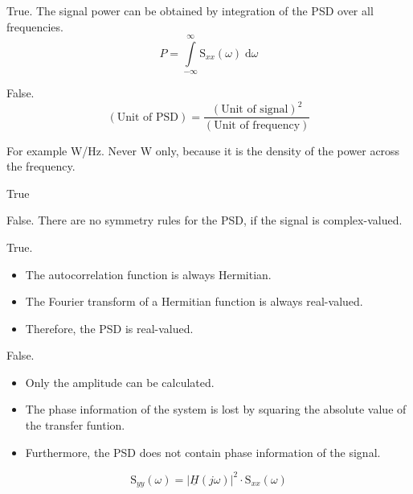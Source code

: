\begin{solution}
	\begin{tasks}
		\task
		True. The signal power can be obtained by integration of the PSD over all frequencies.
		\begin{equation*}
			P = \int\limits_{-\infty}^{\infty} \mathrm{S}_{xx}(\omega) \; \mathrm{d} \omega
		\end{equation*}
		
		\task
		False.
		\begin{equation*}
			\left(\text{Unit of PSD}\right) = \frac{\left(\text{Unit of signal}\right)^2}{\left(\text{Unit of frequency}\right)}
		\end{equation*}
		
		For example \si{W/Hz}. Never \si{W} only, because it is the density of the power across the frequency.
		
		\task
		True
		
		\task
		False. There are no symmetry rules for the PSD, if the signal is complex-valued.
		
		\task
		True.
		\begin{itemize}
			\item The autocorrelation function is always Hermitian.
			\item The Fourier transform of a Hermitian function is always real-valued.
			\item Therefore, the PSD is real-valued.
		\end{itemize}
		
		\task
		False.
		\begin{itemize}
			\item Only the amplitude can be calculated.
			\item The phase information of the system is lost by squaring the absolute value of the transfer funtion.
			\item Furthermore, the PSD does not contain phase information of the signal.
		\end{itemize}
	\begin{equation*}
		\mathrm{S}_{yy}(\omega) = \left|\underline{H}\left(j \omega\right)\right|^2 \cdot \mathrm{S}_{xx}(\omega)
	\end{equation*}
	\end{tasks}
\end{solution}



